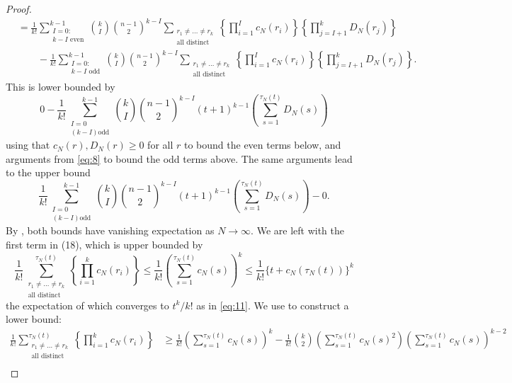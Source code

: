\documentclass{article}
\newcommand{\1}[1]{\mathbb{I}_{#1}}
\begin{document}
\begin{proof}
\begin{align*}
&= \frac{1}{k!} \sum_{\substack{I=0:\\k-I \text{ even}}}^{k-1} \binom{k}{I} \binom{n-1}{2}^{k-I}
\sum_{\substack{r_1\neq\dots\neq r_k \\ \text{all distinct}}}
\left\{ \prod_{i=1}^I c_N(r_i) \right\}
\left\{ \prod_{j=I+1}^k D_N(r_j) \right\} \\
&\qquad - \frac{1}{k!} \sum_{\substack{I=0:\\k-I \text{ odd}}}^{k-1} \binom{k}{I} \binom{n-1}{2}^{k-I}
\sum_{\substack{r_1\neq\dots\neq r_k \\ \text{all distinct}}}
\left\{ \prod_{i=1}^I c_N(r_i) \right\}
\left\{ \prod_{j=I+1}^k D_N(r_j) \right\} .
\end{align*}
This is lower bounded by
\begin{equation*}
0 
- \frac{1}{k!} \sum_{\substack{I=0 \\ (k-I) \text{odd}}}^{k-1}  \binom{k}{I} \binom{n-1}{2}^{k-I}
(t+1)^{k-1}
\left( \sum_{s=1}^{\tau_N(t)} D_N(s) \right)
\end{equation*}
using that $c_N(r), D_N(r) \geq 0$ for all $r$ to bound the even terms below, and arguments from \eqref{eq:8} to bound the odd terms above.
The same arguments lead to the upper bound
\begin{equation*}
\frac{1}{k!} \sum_{\substack{I=0 \\ (k-I) \text{odd}}}^{k-1}  \binom{k}{I} \binom{n-1}{2}^{k-I}
(t+1)^{k-1}
\left( \sum_{s=1}^{\tau_N(t)} D_N(s) \right)
-0 .
\end{equation*}
By \citet[Equation (4)]{brown2020}, both bounds have vanishing expectation as $N\to\infty$.
We are left with the first term in (18), which is upper bounded by
\begin{equation*}
\frac{1}{k!} \sum_{\substack{r_1\neq\dots\neq r_k \\ \text{all distinct}}}^{\tau_N(t)}
\left\{ \prod_{i=1}^k c_N(r_i) \right\}
\leq \frac{1}{k!}\left( \sum_{s=1}^{\tau_N(t)} c_N(s) \right)^k
\leq \frac{1}{k!} \{t + c_N(\tau_N(t)) \}^k
\end{equation*}
the expectation of which converges to $t^k/k!$ as in \eqref{eq:11}.
We use \citet[Equation (8)]{koskela2018} to construct a lower bound:
\begin{align*}
\frac{1}{k!} \sum_{\substack{r_1\neq\dots\neq r_k \\ \text{all distinct}}}^{\tau_N(t)}
\left\{ \prod_{i=1}^k c_N(r_i) \right\} 
&\geq \frac{1}{k!} \left( \sum_{s=1}^{\tau_N(t)} c_N(s) \right)^k
- \frac{1}{k!} \binom{k}{2}  \left( \sum_{s=1}^{\tau_N(t)} c_N(s)^2 \right)  \left( \sum_{s=1}^{\tau_N(t)} c_N(s) \right)^{k-2} \\

\end{align*}
\end{proof}
\end{document}
